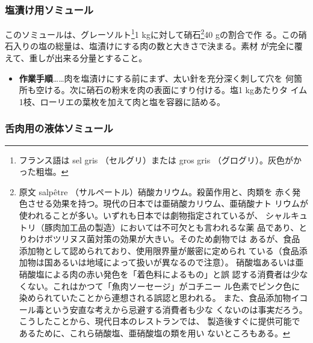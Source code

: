 \vspace*{1\zw}


 
\begin{recette}
\hypertarget{saumure-au-sel}{%
\subsubsection{塩漬け用ソミュール}\label{saumure-au-sel}}



このソミュールは、グレーソルト\footnote{フランス語は sel gris
  （セルグリ）または gros gris （グログリ）。灰色がかった粗塩。}1
kgに対して硝石\footnote{原文 salpêtre
  （サルペートル）硝酸カリウム。殺菌作用と、肉類を
  赤く発色させる効果を持つ。現代の日本では亜硝酸カリウム、亜硝酸ナト
  リウムが使われることが多い。いずれも日本では劇物指定されているが、
  シャルキュトリ（豚肉加工品の製造）においては不可欠とも言われるな薬
  品であり、とりわけボツリヌス菌対策の効果が大きい。そのため劇物では
  あるが、食品添加物として認められており、使用限界量が厳密に定められ
  ている（食品添加物は国あるいは地域によって扱いが異なるので注意）。
  硝酸塩あるいは亜硝酸塩による肉の赤い発色を「着色料によるもの」と誤
  認する消費者は少なくない。これはかつて「魚肉ソーセージ」がコチニー
  ル色素でピンク色に染められていたことから連想される誤認と思われる。
  また、食品添加物イコール毒という安直な考えから忌避する消費者も少な
  くないのは事実だろう。こうしたことから、現代日本のレストランでは、
  製造後すぐに提供可能であるために、これら硝酸塩、亜硝酸塩の類を用い
  ないところもある。}40 gの割合で作
る。この硝石入りの塩の総量は、塩漬けにする肉の数と大きさで決まる。素材
が完全に覆えて、重しが出来る分量とすること。

\begin{itemize}
\tightlist
\item
  \textbf{作業手順}\ldots{}\ldots{}肉を塩漬けにする前にまず、太い針を充分深く刺して穴を
  何箇所も空ける。次に硝石の粉末を肉の表面にすり付ける。塩1 kgあたりタ
  イム1枝、ローリエの葉\undemi{}枚を加えて肉と塩を容器に詰める。
\end{itemize}

\maeaki

\hypertarget{saumure-liquide-pour-langues}{%
\subsubsection{舌肉用の液体ソミュール}\label{saumure-liquide-pour-langues}}


\end{recette}
